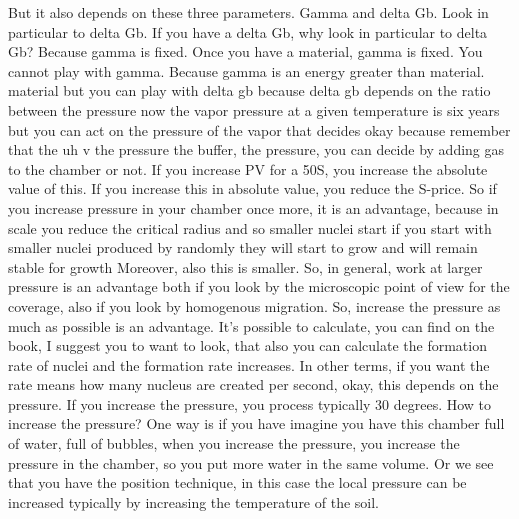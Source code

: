 But it also depends on these three parameters. Gamma and delta Gb. Look in particular to delta Gb. If you have a delta Gb, why look in particular to delta Gb? Because gamma is fixed. Once you have a material, gamma is fixed. You cannot play with gamma. Because gamma is an energy greater than material. material but you can play with delta gb because delta gb depends on the ratio between the pressure now the vapor pressure at a given temperature is six years but you can act on the pressure of the vapor that decides okay because remember that the uh v the pressure the buffer, the pressure, you can decide by adding gas to the chamber or not. If you increase PV for a 50S, you increase the absolute value of this. If you increase this in absolute value, you reduce the S-price. So if you increase pressure in your chamber once more, it is an advantage, because in scale you reduce the critical radius and so smaller nuclei start if you start with smaller nuclei produced by randomly they will start to grow and will remain stable for growth Moreover, also this is smaller. So, in general, work at larger pressure is an advantage both if you look by the microscopic point of view for the coverage, also if you look by homogenous migration. So, increase the pressure as much as possible is an advantage. It's possible to calculate, you can find on the book, I suggest you to want to look, that also you can calculate the formation rate of nuclei and the formation rate increases. In other terms, if you want the rate means how many nucleus are created per second, okay, this depends on the pressure. If you increase the pressure, you process typically 30 degrees. How to increase the pressure? One way is if you have imagine you have this chamber full of water, full of bubbles, when you increase the pressure, you increase the pressure in the chamber, so you put more water in the same volume. Or we see that you have the position technique, in this case the local pressure can be increased typically by increasing the temperature of the soil.

